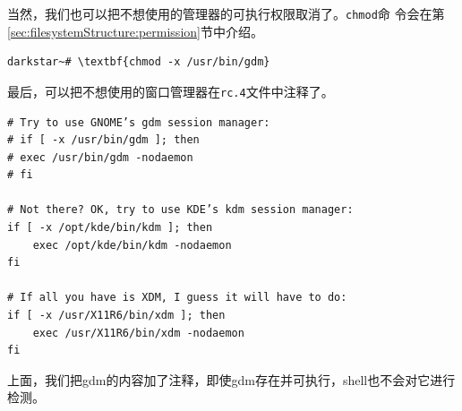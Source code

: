 当然，我们也可以把不想使用的管理器的可执行权限取消了。\texttt{chmod}命
令会在第\ref{sec:filesystemStructure:permission}节中介绍。
\begin{Verbatim}[frame=single, commandchars=\\\{\}]
darkstar~# \textbf{chmod -x /usr/bin/gdm}
\end{Verbatim}

最后，可以把不想使用的窗口管理器在\texttt{rc.4}文件中注释了。
\begin{Verbatim}[frame=single, commandchars=\\\{\}]
# Try to use GNOME’s gdm session manager:
# if [ -x /usr/bin/gdm ]; then
# exec /usr/bin/gdm -nodaemon
# fi

# Not there? OK, try to use KDE’s kdm session manager:
if [ -x /opt/kde/bin/kdm ]; then
    exec /opt/kde/bin/kdm -nodaemon
fi

# If all you have is XDM, I guess it will have to do:
if [ -x /usr/X11R6/bin/xdm ]; then
    exec /usr/X11R6/bin/xdm -nodaemon
fi
\end{Verbatim}
上面，我们把gdm的内容加了注释，即使gdm存在并可执行，shell也不会对它进行
检测。
